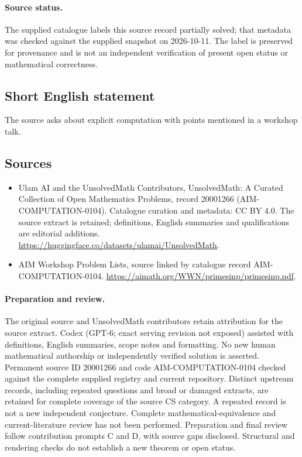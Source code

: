 \documentclass[11pt]{article}
\begin{document}
\paragraph{Source status.}
The supplied catalogue labels this source record partially solved; that metadata was checked against the supplied snapshot on 2026-10-11. The label is preserved for provenance and is not an independent verification of present open status or mathematical correctness.
\subsection{Short English statement}
The source asks about explicit computation with points mentioned in a workshop talk.
\subsection{Sources}
\begin{itemize}
\item[\hypertarget{source:20001266:1}{S1}] Ulam AI and the UnsolvedMath Contributors, UnsolvedMath: A Curated Collection of Open Mathematics Problems, record 20001266 (AIM-COMPUTATION-0104). Catalogue curation and metadata: CC BY 4.0. The source extract is retained; definitions, English summaries and qualifications are editorial additions.
\url{https://huggingface.co/datasets/ulamai/UnsolvedMath}.
\item[\hypertarget{source:20001266:2}{S2}] AIM Workshop Problem Lists, source linked by catalogue record AIM-COMPUTATION-0104.
\url{https://aimath.org/WWN/primesinp/primesinp.pdf}.
\end{itemize}
\paragraph{Preparation and review.}
The original source and UnsolvedMath contributors retain attribution for the source extract. Codex (GPT-6; exact serving revision not exposed) assisted with definitions, English summaries, scope notes and formatting. No new human mathematical authorship or independently verified solution is asserted. Permanent source ID 20001266 and code AIM-COMPUTATION-0104 checked against the complete supplied registry and current repository. Distinct upstream records, including repeated questions and broad or damaged extracts, are retained for complete coverage of the source CS category. A repeated record is not a new independent conjecture. Complete mathematical-equivalence and current-literature review has not been performed. Preparation and final review follow contribution prompts C and D, with source gaps disclosed. Structural and rendering checks do not establish a new theorem or open status.
\label{end:20001266}
\end{document}

